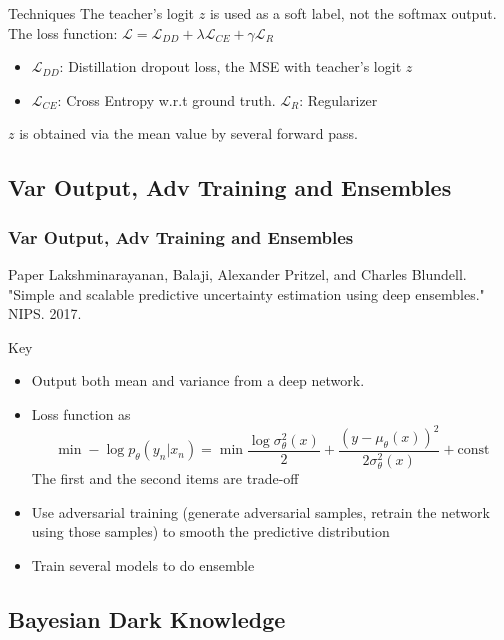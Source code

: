 \documentclass{beamer}
\begin{document}
\begin{frame}
\begin{frame}
\begin{frame}
\begin{frame}
\begin{frame}
\begin{block}{Techniques}
The teacher's logit $z$ is used as a soft label, not the softmax output.
The loss function: $\mathcal{L} = \mathcal{L}_{DD} + \lambda \mathcal{L}_{CE} + \gamma \mathcal{L}_R$
\begin{itemize}
\setlength\itemsep{0em}
\item $\mathcal{L}_{DD}$: Distillation dropout loss, the MSE with teacher's logit $z$
\item $\mathcal{L}_{CE}$: Cross Entropy w.r.t ground truth. $\mathcal{L}_R$: Regularizer
\end{itemize}

$z$ is obtained via the mean value by several forward pass.
\end{block}
\end{frame}


\subsection{Var Output, Adv Training and Ensembles}
\begin{frame}
\frametitle{Var Output, Adv Training and Ensembles}
\begin{block}{Paper}
Lakshminarayanan, Balaji, Alexander Pritzel, and Charles Blundell. "Simple and scalable predictive uncertainty estimation using deep ensembles." NIPS. 2017.
\end{block}

\begin{block}{Key}
\begin{itemize}
\setlength\itemsep{0em}
\item Output both mean and variance from a deep network.
\item Loss function as
\[
\min -\log p_\theta (y_n|x_n) = \min \frac{\log \sigma_\theta^2(x)}{2} + \frac{(y-\mu_\theta(x))^2}{2\sigma_\theta^2(x)} + \text{const}
\]
The first and the second items are trade-off
\item Use adversarial training (generate adversarial samples, retrain the network using those samples) to smooth the predictive distribution
\item Train several models to do ensemble
\end{itemize}
\end{block}
\end{frame}


\subsection{Bayesian Dark Knowledge}


\end{frame}
\end{frame}
\end{frame}
\end{frame}
\end{document}
